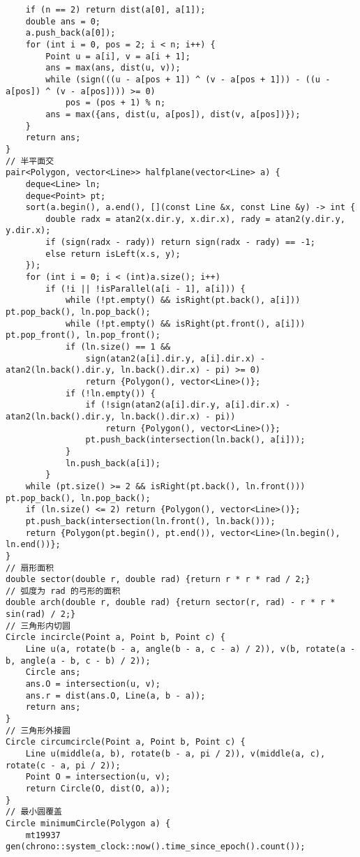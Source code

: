 \begin{verbatim}
    if (n == 2) return dist(a[0], a[1]);
    double ans = 0;
    a.push_back(a[0]);
    for (int i = 0, pos = 2; i < n; i++) {
        Point u = a[i], v = a[i + 1];
        ans = max(ans, dist(u, v));
        while (sign(((u - a[pos + 1]) ^ (v - a[pos + 1])) - ((u - a[pos]) ^ (v - a[pos]))) >= 0)
            pos = (pos + 1) % n;
        ans = max({ans, dist(u, a[pos]), dist(v, a[pos])});
    }
    return ans;
}
// 半平面交
pair<Polygon, vector<Line>> halfplane(vector<Line> a) {
    deque<Line> ln;
    deque<Point> pt;
    sort(a.begin(), a.end(), [](const Line &x, const Line &y) -> int {
        double radx = atan2(x.dir.y, x.dir.x), rady = atan2(y.dir.y, y.dir.x);
        if (sign(radx - rady)) return sign(radx - rady) == -1;
        else return isLeft(x.s, y);
    });
    for (int i = 0; i < (int)a.size(); i++)
        if (!i || !isParallel(a[i - 1], a[i])) {
            while (!pt.empty() && isRight(pt.back(), a[i])) pt.pop_back(), ln.pop_back();
            while (!pt.empty() && isRight(pt.front(), a[i])) pt.pop_front(), ln.pop_front();
            if (ln.size() == 1 &&
                sign(atan2(a[i].dir.y, a[i].dir.x) - atan2(ln.back().dir.y, ln.back().dir.x) - pi) >= 0)
                return {Polygon(), vector<Line>()};
            if (!ln.empty()) {
                if (!sign(atan2(a[i].dir.y, a[i].dir.x) - atan2(ln.back().dir.y, ln.back().dir.x) - pi))
                    return {Polygon(), vector<Line>()};
                pt.push_back(intersection(ln.back(), a[i]));
            }
            ln.push_back(a[i]);
        }
    while (pt.size() >= 2 && isRight(pt.back(), ln.front())) pt.pop_back(), ln.pop_back();
    if (ln.size() <= 2) return {Polygon(), vector<Line>()};
    pt.push_back(intersection(ln.front(), ln.back()));
    return {Polygon(pt.begin(), pt.end()), vector<Line>(ln.begin(), ln.end())};
}
// 扇形面积
double sector(double r, double rad) {return r * r * rad / 2;}
// 弧度为 rad 的弓形的面积
double arch(double r, double rad) {return sector(r, rad) - r * r * sin(rad) / 2;}
// 三角形内切圆
Circle incircle(Point a, Point b, Point c) {
    Line u(a, rotate(b - a, angle(b - a, c - a) / 2)), v(b, rotate(a - b, angle(a - b, c - b) / 2));
    Circle ans;
    ans.O = intersection(u, v);
    ans.r = dist(ans.O, Line(a, b - a));
    return ans;
}
// 三角形外接圆
Circle circumcircle(Point a, Point b, Point c) {
    Line u(middle(a, b), rotate(b - a, pi / 2)), v(middle(a, c), rotate(c - a, pi / 2));
    Point O = intersection(u, v);
    return Circle(O, dist(O, a));
}
// 最小圆覆盖
Circle minimumCircle(Polygon a) {
    mt19937 gen(chrono::system_clock::now().time_since_epoch().count());

\end{verbatim}
